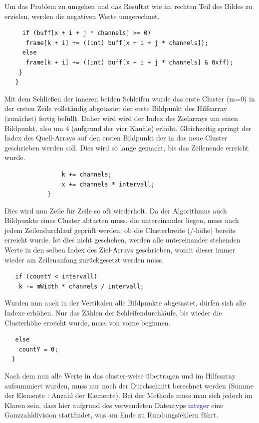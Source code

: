\begin{description}
Um das Problem zu umgehen und das Resultat wie im rechten Teil des Bildes zu erzielen, werden die negativen Werte umgerechnet.
\begin{lstlisting}                    
     if (buff[x + i + j * channels] >= 0)                                               
      frame[k + i] += ((int) buff[x + i + j * channels]);                            
     else
      frame[k + i] += ((int) buff[x + i + j * channels] & 0xff);                     
    }
   }
\end{lstlisting}
Mit dem Schließen der inneren beiden Schleifen wurde das erste Cluster (m=0) in der ersten Zeile vollständig abgetastet der erste Bildpunkt des Hilfsarray (zunächst) fertig befüllt. Daher wird wird der Index des Zielarrays um einen Bildpunkt, also um 4 (aufgrund der vier Kanäle) erhöht. Gleichzeitig springt der Index des Quell-Arrays auf den ersten Bildpunkt der in das neue Cluster geschrieben werden soll. Dies wird so lange gemacht, bis das Zeilenende erreicht wurde.
\begin{lstlisting}                 
                k += channels;                                                                             
                x += channels * intervall;                                                                   
            }
\end{lstlisting}
Dies wird nun Zeile für Zeile so oft wiederholt. Da der Algorithmus auch Bildpunkte eines Cluster abtasten muss, die untereinander liegen, muss nach jedem Zeilendurchlauf geprüft werden, ob die Clusterbreite (/-höhe) bereits erreicht wurde. Ist dies nicht geschehen, werden alle untereinander stehenden Werte in den selben Index des Ziel-Arrays geschrieben, womit dieser immer wieder am Zeilenanfang zurückgesetzt werden muss.
\begin{lstlisting}            
   if (countY < intervall)                                                                   
    k -= mWidth * channels / intervall;                                                          
\end{lstlisting}
Wurden nun auch in der Vertikalen alle Bildpunkte abgetastet, dürfen sich alle Indexe erhöhen. Nur das Zählen der Schleifendurchläufe, bis wieder die Clusterhöhe erreicht wurde, muss von vorne beginnen.
\begin{lstlisting}
   else
    countY = 0;                                                                         
  }
\end{lstlisting}
Nach dem nun alle Werte in das cluster-weise übertragen und im Hilfsarray aufsummiert wurden, muss nur noch der Durchschnitt berechnet werden (Summe der Elemente : Anzahl der Elemente). Bei der Methode muss man sich jedoch im Klaren sein, dass hier aufgrund des verwendeten Datentyps \textcolor{darkblue}{integer} eine Ganzzahldivision stattfindet, was am Ende zu Rundungsfehlern führt.

\end{description}
